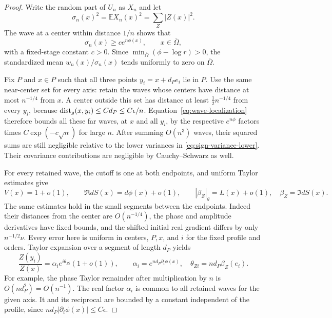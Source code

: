 \begin{proof}
Write the random part of $U_n$ as $X_n$ and let
\[
 \sigma_n(x)^2=\mathbb E X_n(x)^2=\sum_Z|Z(x)|^2.
\]
The wave at a center within distance $1/n$ shows that
\begin{equation}
 \sigma_n(x)\ge c e^{n\phi(x)},\qquad x\in\overline\Omega,
 \label{eq:sign-variance-lower}
\end{equation}
with a fixed-stage constant $c>0$.  Since
$\min_{\overline\Omega}(\phi-\log r)>0$, the standardized mean
$w_n(x)/\sigma_n(x)$ tends uniformly to zero on $\overline\Omega$.

Fix $P$ and $x\in P$ such that all three points
$y_i=x+d_Pe_i$ lie in $P$.  Use the same near-center set for every
axis: retain the waves whose centers have distance at most
$n^{-1/4}$ from $x$.  A center outside this set has distance at
least $\tfrac12n^{-1/4}$ from every $y_i$, because
$\operatorname{dist}_g(x,y_i)\le C d_P\le C\epsilon/n$.
Equation~\eqref{eq:wave-localization} therefore
bounds all these far waves, at $x$ and all $y_i$, by the respective
$e^{n\phi}$ factors times $C\exp(-c\sqrt n)$ for large $n$.
After summing $O(n^3)$ waves, their squared sums are still negligible
relative to the lower variances in
\eqref{eq:sign-variance-lower}.  Their covariance contributions
are negligible by Cauchy--Schwarz as well.

For every retained wave, the cutoff is one at both endpoints, and
uniform Taylor estimates give
\[
 V(x)=1+o(1),\qquad
 \Re dS(x)=d\phi(x)+o(1),\qquad
 |\beta_Z|_g=L(x)+o(1),\quad \beta_Z=\Im dS(x).
\]
The same estimates hold in the small segments between the endpoints.
Indeed their distances from the center are $O(n^{-1/4})$, the phase
and amplitude derivatives have fixed bounds, and the shifted initial
real gradient differs by only $n^{-1/2}\nu$.  Every error here is
uniform in centers, $P,x$, and $i$ for the fixed profile and orders.
Taylor expansion over a segment of length $d_P$ yields
\begin{equation}
 \frac{Z(y_i)}{Z(x)}
   =\alpha_i e^{i\theta_{Zi}}(1+o(1)),
 \qquad
 \alpha_i=e^{nd_P\partial_i\phi(x)},\quad
 \theta_{Zi}=nd_P\beta_Z(e_i).
 \label{eq:sign-wave-ratio}
\end{equation}
For example, the phase Taylor remainder after multiplication by $n$
is $O(nd_P^2)=O(n^{-1})$.  The real factor $\alpha_i$ is common to
all retained waves for the given axis.  It and its reciprocal are
bounded by a constant independent of the profile, since
$nd_P|\partial_i\phi(x)|\le C\epsilon$.


\end{proof}

